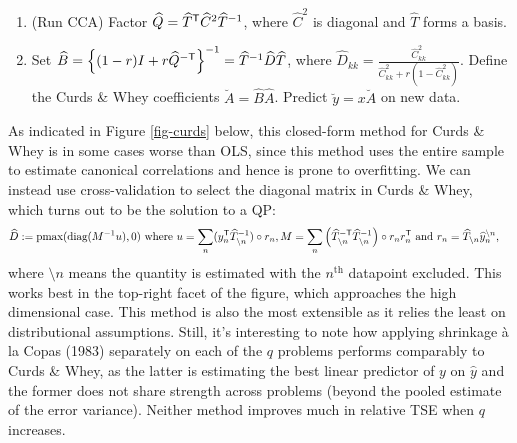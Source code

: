 \documentclass[main]{subfiles}
\begin{document}
\begin{enumerate}
\item (Run CCA) Factor $\widehat{Q} = \widehat{T}^\mathsf T \widehat{C}^2 \widehat{T}^{-1}$, where $\widehat{C}^2$ is diagonal and $\widehat{T}$ forms a basis.
\item Set $\widehat{B} = \left\{(1-r) I + r\widehat{Q}^{-\mathsf T}\right\}^{-1} = \widehat{T}^{-1}\widehat{D} \widehat{T}$, where $\widehat{D}_{kk} = \frac{\widehat{C}_{kk}^2}{\widehat{C}_{kk}^2 + r(1-\widehat{C}_{kk}^2)}$. Define the Curds \& Whey coefficients $\breve{A} = \widehat{B}\widehat{A}$. Predict $\breve{y} = x\breve{A}$ on new data.
\end{enumerate}
As indicated in Figure \ref{fig-curds} below, this closed-form method for Curds \& Whey is in some cases worse than OLS, since this method uses the entire sample to estimate canonical correlations and hence is prone to overfitting. We can instead use cross-validation to select the diagonal matrix in Curds \& Whey, which turns out to be the solution to a QP:
\begin{align*}
\widehat{D} &:=
\text{pmax}(\text{diag}(M^{-1}u),0) \text{ where }
u = \sum_n (y_n^\mathsf T\widehat{T}^{-1}_{\setminus n})\circ r_n,
M = \sum_n \left(\widehat{T}^{-\mathsf T}_{\setminus n}\widehat{T}^{-1}_{\setminus n}\right) \circ r_nr_n^\mathsf T
\text{ and } r_n =  \widehat{T}_{\setminus n}\widehat{y}_n^{\setminus n},
\end{align*}
where $\setminus n$ means the quantity is estimated with the $n^\text{th}$ datapoint excluded. This works best in the top-right facet of the figure, which approaches the high dimensional case. This method is also the most extensible as it relies the least on distributional assumptions. Still, it's interesting to note how applying shrinkage \`a la Copas (1983) separately on each of the $q$ problems performs comparably to Curds \& Whey, as the latter is estimating the best linear predictor of $y$ on $\widehat{y}$ and the former does not share strength across problems (beyond the pooled estimate of the error variance). Neither method improves much in relative TSE when $q$ increases. \\
\end{document}
